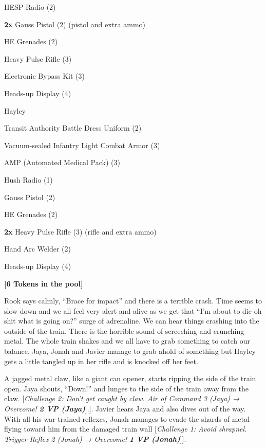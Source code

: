 HESP Radio (2)

\textbf{2x} Gauss Pistol (2) (pistol and extra ammo)

HE Grenades (2)

Heavy Pulse Rifle (3)

Electronic Bypass Kit (3)

Heads-up Display (4)



Hayley

Transit Authority Battle Dress Uniform (2)

Vacuum-sealed Infantry Light Combat Armor (3)

AMP (Automated Medical Pack) (3)

Hush Radio (1)

Gauss Pistol (2)

HE Grenades (2)

\textbf{2x} Heavy Pulse Rifle (3) (rifle and extra ammo)

Hand Arc Welder (2)

Heads-up Display (4)





\textbf{{[}6 Tokens in the pool{]}}



Rook says calmly, ``Brace for impact'' and there is a terrible crash.  Time seems to slow down and we all feel very alert and alive as we get that ``I'm about to die oh shit what is going on?'' surge of adrenaline.  We can hear things crashing into the outside of the train. There is the horrible sound of screeching and crunching metal. The whole train shakes and we all have to grab something to catch our balance.  Jaya, Jonah and Javier manage to grab ahold of something but Hayley gets a little tangled up in her rifle and is knocked off her feet.



A jagged metal claw, like a giant can opener, starts ripping the side of the train open.  Jaya shouts, ``Down!'' and lunges to the side of the train away from the claw.  {[}\textit{Challenge 2: Don't get caught by claw. Air of Command 3 (Jaya) → Overcome! }\textit{\textbf{2 VP (Jaya)}}{]}.{]}.  Javier hears Jaya and also dives out of the way.  With all his war-trained reflexes, Jonah manages to evade the shards of metal flying toward him from the damaged train wall {[}\textit{Challenge 1: Avoid shrapnel. Trigger Reflex 2 (Jonah) → Overcome! }\textit{\textbf{1 VP (Jonah)}}{]}{]}.



